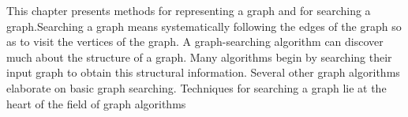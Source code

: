 \documentclass[preview]{standalone}
\begin{document}
\begin{center}
This chapter presents methods for representing a graph and for searching a graph.Searching a graph means systematically following the edges of the graph so as to visit the vertices of the graph. A graph-searching algorithm can discover much about the structure of a graph. Many algorithms begin by searching their input graph to obtain this structural information. Several other graph algorithms elaborate  on basic graph searching. Techniques for searching a graph lie at the heart of the field of graph algorithms
\end{center}
\end{document}

